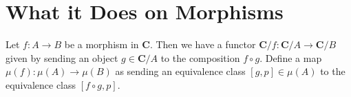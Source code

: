 


\section{What it Does on Morphisms}

\begin{definition}
Let $f : A \to B$ be a morphism in $\mathbf{C}$. Then we have a functor $\mathbf{C}/f : \mathbf{C}/A \to \mathbf{C}/B$ given by sending an object $g \in \mathbf{C}/A$ to the composition $f \circ g$. Define a map $\mu(f) : \mu(A) \to \mu(B)$ as sending an equivalence class $[g,p] \in \mu(A)$ to the equivalence class $[f \circ g, p]$.
\end{definition}


